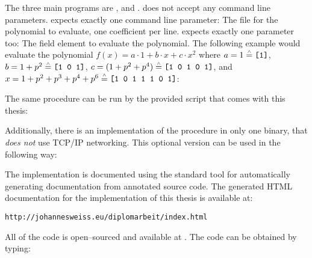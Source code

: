 %
%
\label{sec:usage}

The three main programs are \JWBpOne{}, \JWBpTwo{} and \JWBtoken{}. \JWBtoken{}
does not accept any command line parameters. \JWpOne{} expects exactly one
command line parameter: The file for the polynomial to evaluate, one coefficient
per line. \JWpTwo{} expects exactly one parameter too: The field element to
evaluate the polynomial. The following example would evaluate the polynomial
$f(x) = a \cdot 1 + b \cdot x + c \cdot x^2$ where $a = 1 \stackrel{\scriptscriptstyle\wedge}{=}
\text{\texttt{[1]}}$, $b = 1 + p^2 \stackrel{\scriptscriptstyle\wedge}{=} \text{\texttt{[1 0 1]}}$,
$c = (1 + p^2 + p^4) \stackrel{\scriptscriptstyle\wedge}{=} \text{\texttt{[1 0 1 0 1]}}$, and $x = 1 + p^2
+ p^3 + p^4 + p^6 \stackrel{\scriptscriptstyle\wedge}{=} \text{\texttt{[1 0 1 1 1 0 1]}}$:

\medskip{}





\medskip{}

\noindent{}The same procedure can be run by the provided
 script that comes with this thesis:

\medskip{}


\medskip{}

\noindent{}Additionally, there is an implementation of the procedure in only one
binary, that \emph{does not} use TCP/IP networking. This optional version can be
used in the following way:

\medskip{}



%
%
\label{sec:implementation-doc}

The implementation is documented using \JWTLhaddock{} the standard tool for
automatically generating documentation from annotated \JWThaskell{} source code.
The generated HTML documentation for the implementation of this thesis is
available at:

\medskip{}

\noindent{}
%
            {\texttt{http://johannesweiss.eu/diplomarbeit/index.html}}


%
%
\label{sec:code-availability}

All of the code is open--sourced and available at
. The code can
be obtained by typing:



